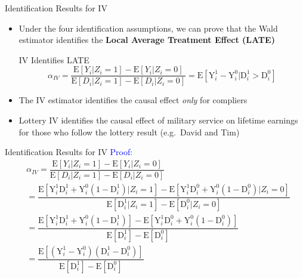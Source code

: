 \documentclass[dvipsnames,hyperref={pdfpagelabels=false}]{beamer}
\begin{document}
\begin{frame}{Identification Results for IV}
	\begin{itemize}

		\item Under the four identification assumptions, we can prove that the Wald estimator identifies the \textbf{Local Average Treatment Effect (LATE)}

\begin{block}{IV Identifies LATE}
	\begin{equation*}
		\alpha_{IV}=\dfrac{\mathrm{E}[Y_{i}|Z_{i}=1]-\mathrm{E}[Y_{i}|Z_{i}=0]}{\mathrm{E}[D_{i}|Z_{i}=1]-\mathrm{E}[D_{i}|Z_{i}=0]}
		= \mathrm{E}[ \mathrm{Y}^{1}_{i} - \mathrm{Y}^{0}_{i} | \mathrm{D}^{1}_{i} > \mathrm{D}^{0}_{i}]
	\end{equation*}
\end{block}

		\vspace{0.2cm}
		\item The IV estimator identifies the causal effect \emph{only} for compliers
		\vspace{0.2cm}
		\item Lottery IV identifies the causal effect of military service on lifetime earnings for those who follow the lottery result (e.g.\ David and Tim)
	\end{itemize}
\end{frame}



\begin{frame}{Identification Results for IV}
	\textcolor{blue}{Proof:}
	\begin{equation*}
		\begin{aligned}
			&\alpha_{IV}=\dfrac{\mathrm{E}[Y_{i}|Z_{i}=1]-\mathrm{E}[Y_{i}|Z_{i}=0]}{\mathrm{E}[D_{i}|Z_{i}=1]-\mathrm{E}[D_{i}|Z_{i}=0]}  \\
			&= \dfrac{\mathrm{E}[\mathrm{Y}^{1}_{i} \mathrm{D}^{1}_{i}+\mathrm{Y}^{0}_{i}(1-\mathrm{D}^{1}_{i})|Z_{i}=1]-\mathrm{E}[\mathrm{Y}^{1}_{i} \mathrm{D}^{0}_{i}+\mathrm{Y}^{0}_{i} (1-\mathrm{D}^{0}_{i})|Z_{i}=0]}{\mathrm{E}[\mathrm{D}^{1}_{i}|Z_{i}=1]-\mathrm{E}[\mathrm{D}^{0}_{i}|Z_{i}=0]}  \\
			&= \dfrac{\mathrm{E}[\mathrm{Y}^{1}_{i} \mathrm{D}^{1}_{i}+\mathrm{Y}^{0}_{i}(1-\mathrm{D}^{1}_{i})]-\mathrm{E}[\mathrm{Y}^{1}_{i} \mathrm{D}^{0}_{i}+\mathrm{Y}^{0}_{i}(1-\mathrm{D}^{0}_{i})]}{\mathrm{E}[\mathrm{D}^{1}_{i}]-\mathrm{E}[\mathrm{D}^{0}_{i}]}\\
			&= \dfrac{\mathrm{E}[(\mathrm{Y}^{1}_{i}-\mathrm{Y}^{0}_{i})(\mathrm{D}^{1}_{i}-\mathrm{D}^{0}_{i})]}{\mathrm{E}[\mathrm{D}^{1}_{i}]-\mathrm{E}[\mathrm{D}^{0}_{i}]}
		\end{aligned}
	\end{equation*}
\end{frame}
\end{document}
